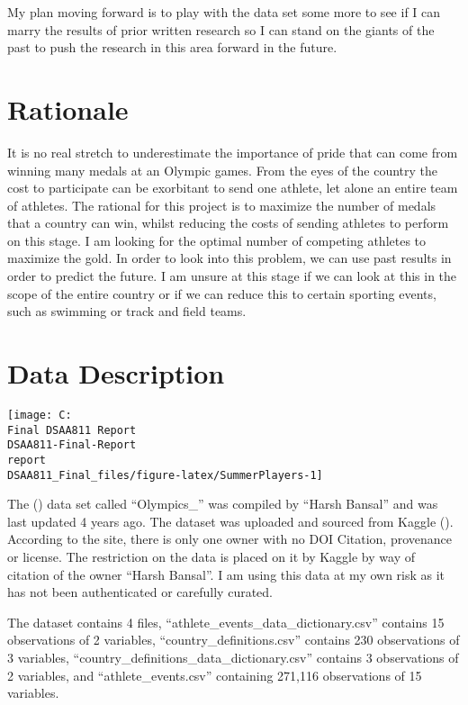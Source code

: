 \documentclass[
]{article}
\begin{document}
My plan moving forward is to play with the data set some more to see if I can marry the results of prior written research so I can stand on the giants of the past to push the research in this area forward in the future.

\section{Rationale}\label{rationale}

It is no real stretch to underestimate the importance of pride that can come from winning many medals at an Olympic games. From the eyes of the country the cost to participate can be exorbitant to send one athlete, let alone an entire team of athletes. The rational for this project is to maximize the number of medals that a country can win, whilst reducing the costs of sending athletes to perform on this stage. I am looking for the optimal number of competing athletes to maximize the gold. In order to look into this problem, we can use past results in order to predict the future.
I am unsure at this stage if we can look at this in the scope of the entire country or if we can reduce this to certain sporting events, such as swimming or track and field teams.

\section{Data Description}\label{data-description}

\begin{center}\texttt{[image: C:\\Final DSAA811 Report\\DSAA811-Final-Report\\report\\DSAA811\_Final\_files/figure-latex/SummerPlayers-1]} \end{center}

The () data set called ``Olympics\_'' was compiled
by ``Harsh Bansal'' and was last updated 4 years ago. The dataset was
uploaded and sourced from Kaggle (). According to
the site, there is only one owner with no DOI Citation, provenance or
license. The restriction on the data is placed on it by Kaggle by way of
citation of the owner ``Harsh Bansal''. I am using this data at my own
risk as it has not been authenticated or carefully curated.

The dataset contains 4 files, ``athlete\_events\_data\_dictionary.csv''
contains 15 observations of 2 variables, ``country\_definitions.csv''
contains 230 observations of 3 variables,
``country\_definitions\_data\_dictionary.csv'' contains 3 observations of 2
variables, and ``athlete\_events.csv'' containing 271,116 observations of
15 variables.
\end{document}
